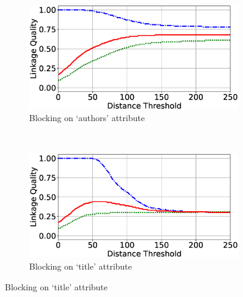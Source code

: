 \documentclass{llncs}
\begin{document}
\begin{figure}
\begin{subfigure}{.47\textwidth}
  \centering
\includegraphics[width=\textwidth]{figures/plotLQ-cora-trad-authors}
\caption{Blocking on `authors' attribute}
\end{subfigure}%
~~
\begin{subfigure}{.47\textwidth}
  \centering
\includegraphics[width=\textwidth]{figures/plotLQ-cora-trad-title}
\caption{Blocking on `title' attribute}
\end{subfigure} %


\end{figure}
\end{document}
